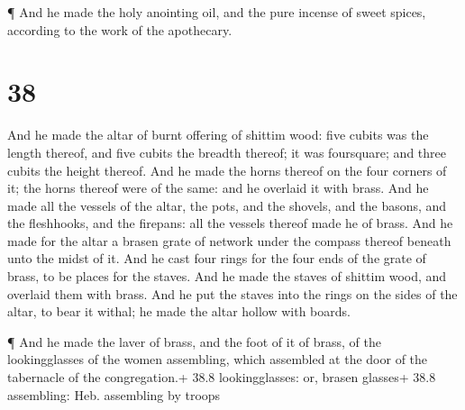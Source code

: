  ¶ And he made the holy anointing oil, and the pure incense
of sweet spices, according to the work of the apothecary.

\hypertarget{section-37}{%
\section{38}\label{section-37}}

 And he made the altar of burnt offering of shittim wood:
five cubits was the length thereof, and five cubits the breadth thereof;
it was foursquare; and three cubits the height thereof.  And
he made the horns thereof on the four corners of it; the horns thereof
were of the same: and he overlaid it with brass.  And he
made all the vessels of the altar, the pots, and the shovels, and the
basons, and the fleshhooks, and the firepans: all the vessels thereof
made he of brass.  And he made for the altar a brasen grate
of network under the compass thereof beneath unto the midst of it.
 And he cast four rings for the four ends of the grate of
brass, to be places for the staves.  And he made the staves
of shittim wood, and overlaid them with brass.  And he put
the staves into the rings on the sides of the altar, to bear it withal;
he made the altar hollow with boards.

 ¶ And he made the laver of brass, and the foot of it of
brass, of the lookingglasses of the women assembling, which assembled at
the door of the tabernacle of the congregation.+ 38.8 lookingglasses:
or, brasen glasses+ 38.8 assembling: Heb. assembling by troops

